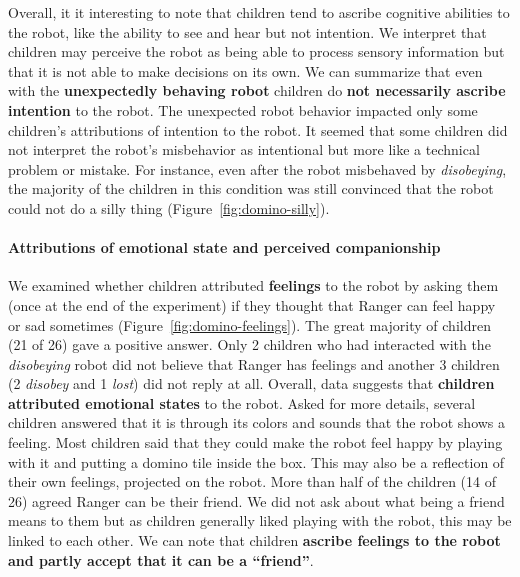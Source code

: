 \documentclass{sig-alternate}
\begin{document}
Overall, it it interesting to note that children tend to ascribe cognitive
abilities to the robot, like the ability to see and hear but not intention. We
interpret that children may perceive the robot as being able to process sensory
information but that it is not able to make decisions on its own. We can
summarize that even with the \textbf{unexpectedly behaving robot} children do
\textbf{not necessarily ascribe intention} to the robot. The unexpected robot
behavior impacted only some children's attributions of intention to the robot.
It seemed that some children did not interpret the robot's misbehavior as
intentional but more like a technical problem or mistake. For instance, even
after the robot misbehaved by \textit{disobeying}, the majority of the children
in this condition was still convinced that the robot could not do a silly thing
(Figure~\ref{fig:domino-silly}).


\paragraph{Attributions of emotional state and perceived companionship}

We examined whether children attributed \textbf{feelings} to the robot by asking
them (once at the end of the experiment) if they thought that Ranger can feel
happy or sad sometimes (Figure~\ref{fig:domino-feelings}). The great majority of
children (21 of 26) gave a positive answer. Only 2 children who had interacted
with the \textit{disobeying} robot did not believe that Ranger has feelings and
another 3 children (2 \textit{disobey} and 1 \textit{lost}) did not reply at
all. Overall, data suggests that \textbf{children attributed emotional states}
to the robot. Asked for more details, several children answered that it is
through its colors and sounds that the robot shows a feeling. Most children said
that they could make the robot feel happy by playing with it and putting a
domino tile inside the box. This may also be a reflection of their own feelings,
projected on the robot.  More than half of the children (14 of 26) agreed Ranger
can be their friend. We did not ask about what being a friend means to them but
as children generally liked playing with the robot, this may be linked to each
other. We can note that children \textbf{ascribe feelings to the robot and
partly accept that it can be a ``friend''}.

	
\end{document}
